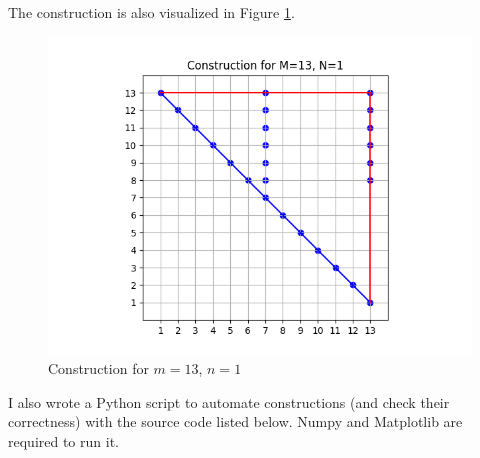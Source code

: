 \documentclass[10pt]{../usamts}
\begin{document}
\begin{solution}
The construction is also visualized in Figure \ref{fig:131construct}.

\begin{figure}[ht]
\centering
    \includegraphics[width=12cm]{round2/p5construct/construct_13_1.png}
    \caption{Construction for $m=13$, $n=1$}
    \label{fig:131construct}
\end{figure}

I also wrote a Python script to automate constructions (and check their correctness) with the source code listed below. Numpy and Matplotlib are required to run it.

\clearpage

\inputminted{python}{p5construct/algorithm.py}

\end{solution}
\end{document}
